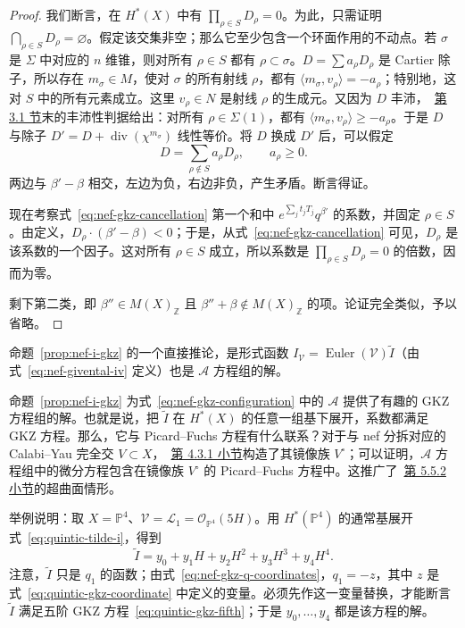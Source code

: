 \begin{proof}
我们断言，在 $H^*(X)$ 中有 $\prod_{\rho\in S}D_\rho=0$。为此，只需证明 $\bigcap_{\rho\in S}D_\rho=\varnothing$。假定该交集非空；那么它至少包含一个环面作用的不动点。若 $\sigma$ 是 $\Sigma$ 中对应的 $n$ 维锥，则对所有 $\rho\in S$ 都有 $\rho\subset\sigma$。$D=\sum a_\rho D_\rho$ 是 Cartier 除子，所以存在 $m_\sigma\in M$，使对 $\sigma$ 的所有射线 $\rho$，都有 $\langle m_\sigma,v_\rho\rangle=-a_\rho$；特别地，这对 $S$ 中的所有元素成立。这里 $v_\rho\in N$ 是射线 $\rho$ 的生成元。又因为 $D$ 丰沛，~\hyperref[sec:cones-fans]{第 3.1 节}末的丰沛性判据给出：对所有 $\rho\in\Sigma(1)$，都有 $\langle m_\sigma,v_\rho\rangle\geq-a_\rho$。于是 $D$ 与除子 $D'=D+\operatorname{div}(\chi^{m_\sigma})$ 线性等价。将 $D$ 换成 $D'$ 后，可以假定
\begin{equation}\label{eq:nef-gkz-divisor-contradiction}
D=\sum_{\rho\notin S}a_\rho D_\rho,\qquad a_\rho\geq0.
\end{equation}
两边与 $\beta'-\beta$ 相交，左边为负，右边非负，产生矛盾。断言得证。

现在考察式~\eqref{eq:nef-gkz-cancellation} 第一个和中 $e^{\sum_jt_jT_j}q^{\beta'}$ 的系数，并固定 $\rho\in S$。由定义，$D_\rho\cdot(\beta'-\beta)<0$；于是，从式~\eqref{eq:nef-gkz-cancellation} 可见，$D_\rho$ 是该系数的一个因子。这对所有 $\rho\in S$ 成立，所以系数是 $\prod_{\rho\in S}D_\rho=0$ 的倍数，因而为零。

剩下第二类，即 $\beta''\in M(X)_{\mathbb Z}$ 且 $\beta''+\beta\notin M(X)_{\mathbb Z}$ 的项。论证完全类似，予以省略。
\end{proof}

命题~\ref{prop:nef-i-gkz} 的一个直接推论，是形式函数 $I_{\mathcal V}=\operatorname{Euler}(\mathcal V)\widetilde I$（由式~\eqref{eq:nef-givental-iv} 定义）也是 $\mathcal A$ 方程组的解。

命题~\ref{prop:nef-i-gkz} 为式~\eqref{eq:nef-gkz-configuration} 中的 $\mathcal A$ 提供了有趣的 GKZ 方程组的解。也就是说，把 $\widetilde I$ 在 $H^*(X)$ 的任意一组基下展开，系数都满足 GKZ 方程。那么，它与 Picard--Fuchs 方程有什么联系？对于与 nef 分拆对应的 Calabi--Yau 完全交 $V\subset X$，~\hyperref[subsec:nef-partitions]{第 4.3.1 小节}构造了其镜像族 $V^\circ$；可以证明，$\mathcal A$ 方程组中的微分方程包含在镜像族 $V^\circ$ 的 Picard--Fuchs 方程中。这推广了~\hyperref[subsec:toric-gkz]{第 5.5.2 小节}的超曲面情形。

举例说明：取 $X=\mathbb P^4$、$\mathcal V=\mathcal L_1=\mathcal O_{\mathbb P^4}(5H)$。用 $H^*(\mathbb P^4)$ 的通常基展开式~\eqref{eq:quintic-tilde-i}，得到
\begin{equation}\label{eq:quintic-i-expansion}
\widetilde I=y_0+y_1H+y_2H^2+y_3H^3+y_4H^4.
\end{equation}
注意，$\widetilde I$ 只是 $q_1$ 的函数；由式~\eqref{eq:nef-gkz-q-coordinates}，$q_1=-z$，其中 $z$ 是式~\eqref{eq:quintic-gkz-coordinate} 中定义的变量。必须先作这一变量替换，才能断言 $\widetilde I$ 满足五阶 GKZ 方程~\eqref{eq:quintic-gkz-fifth}；于是 $y_0,\ldots,y_4$ 都是该方程的解。

